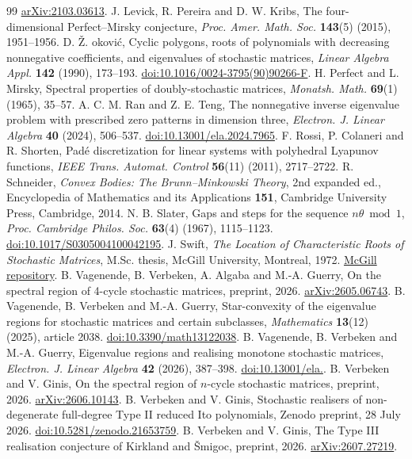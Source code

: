 \documentclass[11pt,a4paper]{article}
\theoremstyle{definition}
\theoremstyle{remark}
\numberwithin{equation}{section}
\begin{document}
\begin{thebibliography}{99}
\href{https://arxiv.org/abs/2103.03613}{arXiv:2103.03613}.
 J. Levick, R. Pereira and D. W. Kribs,
The four-dimensional Perfect--Mirsky conjecture,
\emph{Proc. Amer. Math. Soc.} \textbf{143}(5) (2015), 1951--1956.
 D. \v{Z}. \DJ{}okovi\'c,
Cyclic polygons, roots of polynomials with decreasing nonnegative coefficients, and eigenvalues of stochastic matrices,
\emph{Linear Algebra Appl.} \textbf{142} (1990), 173--193.
\href{https://doi.org/10.1016/0024-3795(90)90266-F}{doi:10.1016/0024-3795(90)90266-F}.
 H. Perfect and L. Mirsky,
Spectral properties of doubly-stochastic matrices,
\emph{Monatsh. Math.} \textbf{69}(1) (1965), 35--57.
 A. C. M. Ran and Z. E. Teng,
The nonnegative inverse eigenvalue problem with prescribed zero patterns in dimension three,
\emph{Electron. J. Linear Algebra} \textbf{40} (2024), 506--537.
\href{https://doi.org/10.13001/ela.2024.7965}{doi:10.13001/ela.2024.7965}.
 F. Rossi, P. Colaneri and R. Shorten,
Pad\'e discretization for linear systems with polyhedral Lyapunov functions,
\emph{IEEE Trans. Automat. Control} \textbf{56}(11) (2011), 2717--2722.
 R. Schneider,
\emph{Convex Bodies: The Brunn--Minkowski Theory}, 2nd expanded ed.,
Encyclopedia of Mathematics and its Applications \textbf{151},
Cambridge University Press, Cambridge, 2014.
 N. B. Slater,
Gaps and steps for the sequence $n\theta\bmod1$,
\emph{Proc. Cambridge Philos. Soc.} \textbf{63}(4) (1967), 1115--1123.
\href{https://doi.org/10.1017/S0305004100042195}{doi:10.1017/S0305004100042195}.
 J. Swift,
\emph{The Location of Characteristic Roots of Stochastic Matrices},
M.Sc. thesis, McGill University, Montreal, 1972.
\href{https://escholarship.mcgill.ca/concern/theses/12579t72d}{McGill repository}.
 B. Vagenende, B. Verbeken, A. Algaba and M.-A. Guerry,
On the spectral region of 4-cycle stochastic matrices, preprint, 2026.
\href{https://arxiv.org/abs/2605.06743}{arXiv:2605.06743}.
 B. Vagenende, B. Verbeken and M.-A. Guerry,
Star-convexity of the eigenvalue regions for stochastic matrices and certain subclasses,
\emph{Mathematics} \textbf{13}(12) (2025), article 2038.
\href{https://doi.org/10.3390/math13122038}{doi:10.3390/math13122038}.
 B. Vagenende, B. Verbeken and M.-A. Guerry,
Eigenvalue regions and realising monotone stochastic matrices,
\emph{Electron. J. Linear Algebra} \textbf{42} (2026), 387--398.
\href{https://doi.org/10.13001/ela.2026.10159}{doi:10.13001/ela.}.
 B. Verbeken and V. Ginis,
On the spectral region of $n$-cycle stochastic matrices, preprint, 2026.
\href{https://arxiv.org/abs/2606.10143}{arXiv:2606.10143}.
 B. Verbeken and V. Ginis,
Stochastic realisers of non-degenerate full-degree Type II reduced Ito polynomials,
Zenodo preprint, 28 July 2026.
\href{https://doi.org/10.5281/zenodo.21653759}{doi:10.5281/zenodo.21653759}.
 B. Verbeken and V. Ginis,
The Type III realisation conjecture of Kirkland and \v{S}migoc,
preprint, 2026.
\href{https://arxiv.org/abs/2607.27219}{arXiv:2607.27219}.
\end{thebibliography}

\end{document}
